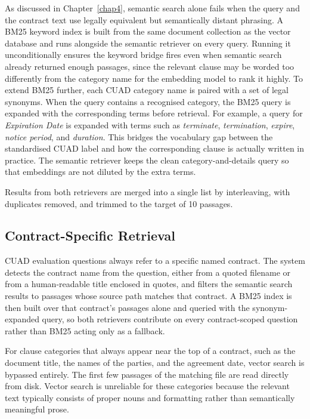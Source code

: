 As discussed in Chapter~\ref{chap4}, semantic search alone fails when the query and the contract text use legally equivalent but semantically distant phrasing. A BM25 keyword index is built from the same document collection as the vector database and runs alongside the semantic retriever on every query. Running it unconditionally ensures the keyword bridge fires even when semantic search already returned enough passages, since the relevant clause may be worded too differently from the category name for the embedding model to rank it highly. To extend BM25 further, each CUAD category name is paired with a set of legal synonyms. When the query contains a recognised category, the BM25 query is expanded with the corresponding terms before retrieval. For example, a query for \textit{Expiration Date} is expanded with terms such as \textit{terminate}, \textit{termination}, \textit{expire}, \textit{notice period}, and \textit{duration}. This bridges the vocabulary gap between the standardised CUAD label and how the corresponding clause is actually written in practice. The semantic retriever keeps the clean category-and-details query so that embeddings are not diluted by the extra terms.

Results from both retrievers are merged into a single list by interleaving, with
duplicates removed, and trimmed to the target of 10 passages.

\subsection{Contract-Specific Retrieval}

CUAD evaluation questions always refer to a specific named contract. The system detects the contract name from the question, either from a quoted filename or from a human-readable title enclosed in quotes, and filters the semantic search results to passages whose source path matches that contract. A BM25 index is then built over that contract's passages alone and queried with the synonym-expanded query, so both retrievers contribute on every contract-scoped question rather than BM25 acting only as a fallback.


For clause categories that always appear near the top of a contract, such as the document title, the names of the parties, and the agreement date, vector search is bypassed entirely. The first few passages of the matching file are read directly from disk. Vector search is unreliable for these categories because the relevant text typically consists of proper nouns and formatting rather than semantically meaningful prose.

